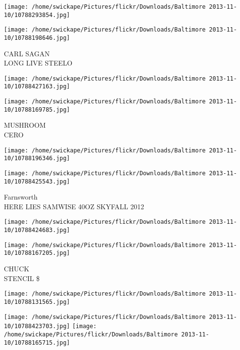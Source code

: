 \documentclass[10pt,letterpaper]{article}
\begin{document}
\texttt{[image: /home/swickape/Pictures/flickr/Downloads/Baltimore 2013-11-10/10788293854.jpg]}

\vspace{0.25in}
\texttt{[image: /home/swickape/Pictures/flickr/Downloads/Baltimore 2013-11-10/10788198646.jpg]}

CARL SAGAN\\
LONG LIVE STEELO\\
\pagebreak

\texttt{[image: /home/swickape/Pictures/flickr/Downloads/Baltimore 2013-11-10/10788427163.jpg]}

\vspace{0.25in}
\texttt{[image: /home/swickape/Pictures/flickr/Downloads/Baltimore 2013-11-10/10788169785.jpg]}

MUSHROOM\\
CERO\\
\pagebreak

\texttt{[image: /home/swickape/Pictures/flickr/Downloads/Baltimore 2013-11-10/10788196346.jpg]}

\vspace{0.25in}
\texttt{[image: /home/swickape/Pictures/flickr/Downloads/Baltimore 2013-11-10/10788425543.jpg]}

Farnsworth\\
HERE LIES SAMWISE 40OZ SKYFALL 2012\\
\pagebreak

\texttt{[image: /home/swickape/Pictures/flickr/Downloads/Baltimore 2013-11-10/10788424683.jpg]}

\vspace{0.25in}
\texttt{[image: /home/swickape/Pictures/flickr/Downloads/Baltimore 2013-11-10/10788167205.jpg]}

CHUCK\\
STENCIL \$\\
\pagebreak

\texttt{[image: /home/swickape/Pictures/flickr/Downloads/Baltimore 2013-11-10/10788131565.jpg]}

\vspace{0.25in}
\texttt{[image: /home/swickape/Pictures/flickr/Downloads/Baltimore 2013-11-10/10788423703.jpg]}
\texttt{[image: /home/swickape/Pictures/flickr/Downloads/Baltimore 2013-11-10/10788165715.jpg]}
\end{document}
